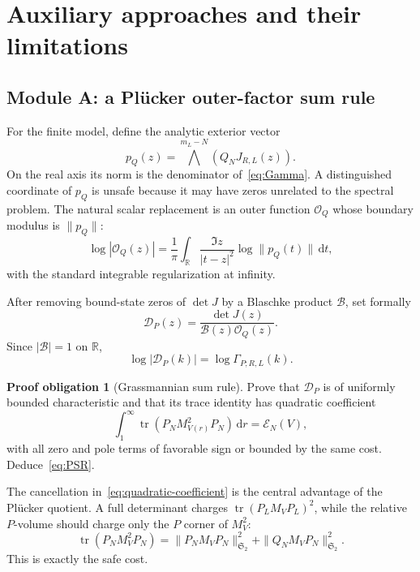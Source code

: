 \documentclass[11pt]{article}
\newcommand{\R}{\mathbb R}
\newcommand{\cE}{\mathcal E}
\newcommand{\HS}{\mathfrak S_2}
\newcommand{\dd}{\,\mathrm d}
\DeclareMathOperator{\tr}{tr}
\theoremstyle{definition}
\newtheorem{problem}[theorem]{Proof obligation}
\theoremstyle{remark}
\begin{document}
\section{Auxiliary approaches and their limitations}

\subsection{Module A: a Pl\"ucker outer-factor sum rule}

For the finite model, define the analytic exterior vector
\begin{equation}
 p_Q(z)=\bigwedge^{m_L-N}\!\left(Q_NJ_{R,L}(z)\right).
 \label{eq:pQ}
\end{equation}
On the real axis its norm is the denominator of~\eqref{eq:Gamma}.  A distinguished coordinate of $p_Q$ is unsafe because it may have zeros unrelated to the spectral problem.  The natural scalar replacement is an outer function $\mathcal O_Q$ whose boundary modulus is $\|p_Q\|$:
\begin{equation}
 \log|\mathcal O_Q(z)|
 =\frac1\pi\int_{\R}
   \frac{\Im z}{|t-z|^2}\log\|p_Q(t)\|\dd t,
 \label{eq:outer-Q}
\end{equation}
with the standard integrable regularization at infinity.

After removing bound-state zeros of $\det J$ by a Blaschke product $\mathcal B$, set formally
\begin{equation}
 \mathcal D_P(z)
 =\frac{\det J(z)}{\mathcal B(z)\mathcal O_Q(z)}.
 \label{eq:relative-outer}
\end{equation}
Since $|\mathcal B|=1$ on $\R$,
\begin{equation}
 \log|\mathcal D_P(k)|=\log\Gamma_{P;R,L}(k).
 \label{eq:D-Gamma}
\end{equation}

\begin{problem}[Grassmannian sum rule]\label{prob:grassmann-sum-rule}
Prove that $\mathcal D_P$ is of uniformly bounded characteristic and that its trace identity has quadratic coefficient
\begin{equation}
 \int_1^\infty\tr\!\left(P_NM_{V(r)}^2P_N\right)\dd r
 =\cE_N(V),
 \label{eq:quadratic-coefficient}
\end{equation}
with all zero and pole terms of favorable sign or bounded by the same cost.  Deduce~\eqref{eq:PSR}.
\end{problem}

The cancellation in~\eqref{eq:quadratic-coefficient} is the central advantage of the Pl\"ucker quotient.  A full determinant charges $\tr(P_LM_VP_L)^2$, while the relative $P$-volume should charge only the $P$ corner of $M_V^2$:
\begin{equation}
 \tr(P_NM_V^2P_N)
 =\|P_NM_VP_N\|_{\HS}^2+\|Q_NM_VP_N\|_{\HS}^2.
 \label{eq:desired-trace}
\end{equation}
This is exactly the safe cost.
\end{document}
